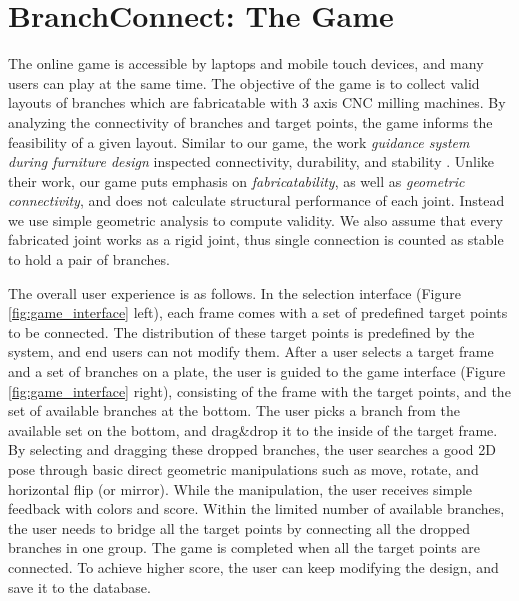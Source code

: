 \section{BranchConnect: The Game}
\label{sec:game}
The online game is accessible by laptops and mobile touch devices, and many users can play at the same time.
The objective of the game is to collect valid layouts of branches which are fabricatable with 3 axis CNC milling machines.
By analyzing the connectivity of branches and target points, the game informs the feasibility of a given layout.
Similar to our game, the work \textit{guidance system during furniture design} inspected connectivity, durability, and stability \cite{umetani2012guided}.
Unlike their work, our game puts emphasis on \textit{fabricatability}, as well as \textit{geometric connectivity}, and does not calculate structural performance of each joint.
Instead we use simple geometric analysis to compute validity.
We also assume that every fabricated joint works as a rigid joint, thus single connection is counted as stable to hold a pair of branches.



The overall user experience is as follows.
In the selection interface (Figure \ref{fig:game_interface} left), each frame comes with a set of predefined target points to be connected.
The distribution of these target points is predefined by the system, and end users can not modify them.
After a user selects a target frame and a set of branches on a plate, the user is guided to the game interface (Figure \ref{fig:game_interface} right), consisting of the frame with the target points, and the set of available branches at the bottom.
The user picks a branch from the available set on the bottom, and drag\&drop it to the inside of the target frame.
By selecting and dragging these dropped branches, the user searches a good 2D pose through basic direct geometric manipulations such as move, rotate, and horizontal flip (or mirror).
While the manipulation, the user receives simple feedback with colors and score.
Within the limited number of available branches, the user needs to bridge all the target points by connecting all the dropped branches in one group.
The game is completed when all the target points are connected.
To achieve higher score, the user can keep modifying the design, and save it to the database.

